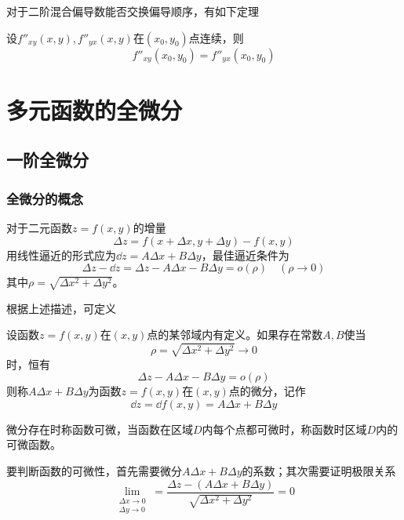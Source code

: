对于二阶混合偏导数能否交换偏导顺序，有如下定理
\begin{theorem}
    设$f''_{xy}(x,y),f''_{yx}(x,y)$在$(x_0,y_0)$点连续，则
    \[ f''_{xy}(x_0,y_0) = f''_{yx}(x_0,y_0) \]
\end{theorem}

\section{多元函数的全微分}
\subsection{一阶全微分}
\subsubsection{全微分的概念}
对于二元函数$z=f(x,y)$的增量
\[ \Delta z = f(x+\Delta x,y+\Delta y) - f(x,y) \]
用线性逼近的形式应为$\dd{z} = A \Delta x + B \Delta y$，最佳逼近条件为
\[ \Delta z- \dd{z} = \Delta z - A\Delta x - B \Delta y = o(\rho) \quad (\rho \to 0) \]
其中$\rho = \sqrt{\Delta x^2 + \Delta y^2}$。

根据上述描述，可定义
\begin{definition}
    设函数$z=f(x,y)$在$(x,y)$点的某邻域内有定义。如果存在常数$A,B$使当
    \[ \rho = \sqrt{\Delta x^2 + \Delta y^2} \to 0 \]
    时，恒有
    \[ \Delta z - A\Delta x - B\Delta y = o(\rho) \]
    则称$A\Delta x + B\Delta y$为函数$z=f(x,y)$在$(x,y)$点的微分，记作
    \[ \dd{z} = \dd{f}(x,y) = A\Delta x + B\Delta y \]
\end{definition}
微分存在时称函数可微，当函数在区域$D$内每个点都可微时，称函数时区域$D$内的可微函数。

要判断函数的可微性，首先需要微分$A\Delta x+ B\Delta y$的系数；其次需要证明极限关系
\begin{equation}
    \lim_{\substack{\Delta x\to 0\\ \Delta y \to 0}}
    = \frac{\Delta z - (A\Delta x + B\Delta y)}{\sqrt{\Delta x^2 + \Delta y^2}}
    =0
\end{equation}

